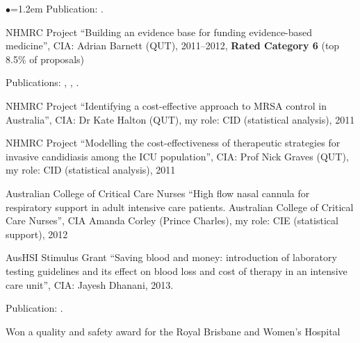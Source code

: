 \documentclass[a4paper,11pt]{article}
\renewcommand{\labelitemi}{$\bullet$}
\begin{document}
\begin{raggedright}
\begin{list}{\labelitemi}{\leftmargin=1.2em}
    Publication: .

\item NHMRC Project ``Building an evidence base for funding evidence-based medicine'', CIA: Adrian Barnett (QUT), 2011--2012, \textbf{Rated Category 6} (top 8.5\% of proposals)

    Publications: , , .

\item NHMRC Project ``Identifying a cost-effective approach to MRSA control in Australia'', CIA: Dr Kate Halton (QUT), my role: CID (statistical analysis), 2011

\item NHMRC Project ``Modelling the cost-effectiveness of therapeutic strategies for invasive candidiasis among the ICU population'', CIA: Prof Nick Graves (QUT), my role: CID (statistical analysis), 2011

\item Australian College of Critical Care Nurses ``High flow nasal cannula for respiratory support in adult intensive care patients. Australian College of Critical Care Nurses'', CIA Amanda Corley (Prince Charles), my role: CIE (statistical support), 2012




\item AusHSI Stimulus Grant ``Saving blood and money: introduction of laboratory testing guidelines and its effect on blood loss and cost of therapy in an intensive care unit'', CIA: Jayesh Dhanani, 2013.

Publication: .

Won a quality and safety award for the Royal Brisbane and Women's Hospital


\end{list}
\end{raggedright}
\end{document}
